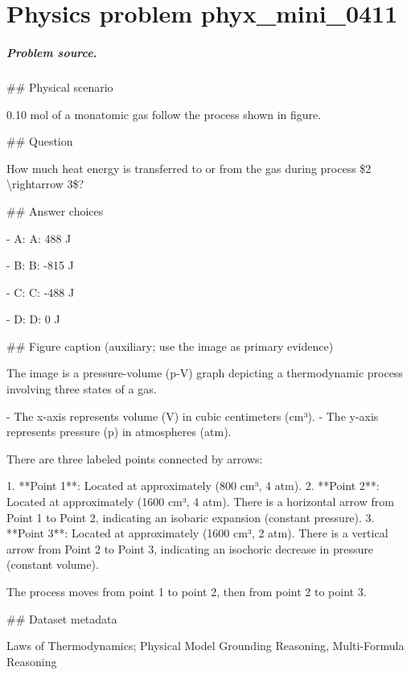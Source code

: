 
\chapter{Physics problem phyx\_mini\_0411}
\label{ch:PhyXMiniProblems_problem_phyx_mini_0411}

\paragraph{Problem source.}
\#\# Physical scenario

0.10 mol of a monatomic gas follow the process shown in figure.

\#\# Question

How much heat energy is transferred to or from the gas during process \$2 \textbackslash{}rightarrow 3\$?

\#\# Answer choices

- A: A: 488 J

- B: B: -815 J

- C: C: -488 J

- D: D: 0 J

\#\# Figure caption (auxiliary; use the image as primary evidence)

The image is a pressure-volume (p-V) graph depicting a thermodynamic process involving three states of a gas. 

- The x-axis represents volume (V) in cubic centimeters (cm³).
- The y-axis represents pressure (p) in atmospheres (atm).

There are three labeled points connected by arrows:

1. **Point 1**: Located at approximately (800 cm³, 4 atm).
2. **Point 2**: Located at approximately (1600 cm³, 4 atm). There is a horizontal arrow from Point 1 to Point 2, indicating an isobaric expansion (constant pressure).
3. **Point 3**: Located at approximately (1600 cm³, 2 atm). There is a vertical arrow from Point 2 to Point 3, indicating an isochoric decrease in pressure (constant volume).

The process moves from point 1 to point 2, then from point 2 to point 3.

\#\# Dataset metadata

Laws of Thermodynamics; Physical Model Grounding Reasoning, Multi-Formula Reasoning

